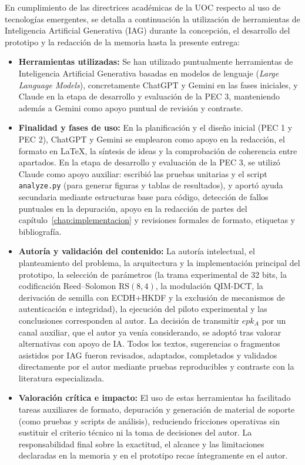 \documentclass[IB]{TFUOC}%
\begin{document}
En cumplimiento de las directrices académicas de la UOC respecto al uso de tecnologías emergentes, se detalla a continuación la utilización de herramientas de Inteligencia Artificial Generativa (IAG) durante la concepción, el desarrollo del prototipo y la redacción de la memoria hasta la presente entrega:

\begin{itemize}
    \item \textbf{Herramientas utilizadas:} Se han utilizado puntualmente herramientas de Inteligencia Artificial Generativa basadas en modelos de lenguaje (\textit{Large Language Models}), concretamente ChatGPT y Gemini en las fases iniciales, y Claude en la etapa de desarrollo y evaluación de la PEC 3, manteniendo además a Gemini como apoyo puntual de revisión y contraste.

    \item \textbf{Finalidad y fases de uso:} En la planificación y el diseño inicial (PEC 1 y PEC 2), ChatGPT y Gemini se emplearon como apoyo en la redacción, el formato en \LaTeX{}, la síntesis de ideas y la comprobación de coherencia entre apartados. En la etapa de desarrollo y evaluación de la PEC 3, se utilizó Claude como apoyo auxiliar: escribió las pruebas unitarias y el script \texttt{analyze.py} (para generar figuras y tablas de resultados), y aportó ayuda secundaria mediante estructuras base para código, detección de fallos puntuales en la depuración, apoyo en la redacción de partes del capítulo~\ref{chap:implementacion} y revisiones formales de formato, etiquetas y bibliografía.

    \item \textbf{Autoría y validación del contenido:} La autoría intelectual, el planteamiento del problema, la arquitectura y la implementación principal del prototipo, la selección de parámetros (la trama experimental de 32 bits, la codificación Reed--Solomon $\mathrm{RS}(8,4)$, la modulación $\mathrm{QIM\text{-}DCT}$, la derivación de semilla con ECDH+HKDF y la exclusión de mecanismos de autenticación e integridad), la ejecución del piloto experimental y las conclusiones corresponden al autor. La decisión de transmitir $epk_A$ por un canal auxiliar, que el autor ya venía considerando, se adoptó tras valorar alternativas con apoyo de IA. Todos los textos, sugerencias o fragmentos asistidos por IAG fueron revisados, adaptados, completados y validados directamente por el autor mediante pruebas reproducibles y contraste con la literatura especializada.

    \item \textbf{Valoración crítica e impacto:} El uso de estas herramientas ha facilitado tareas auxiliares de formato, depuración y generación de material de soporte (como pruebas y scripts de análisis), reduciendo fricciones operativas sin sustituir el criterio técnico ni la toma de decisiones del autor. La responsabilidad final sobre la exactitud, el alcance y las limitaciones declaradas en la memoria y en el prototipo recae íntegramente en el autor.
\end{itemize}
\end{document}
